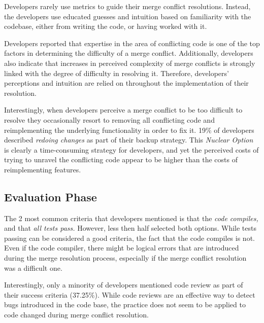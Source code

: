 Developers rarely use metrics to guide their merge conflict resolutions.
Instead, the developers use educated guesses and intuition based on familiarity with the codebase, either from writing the code, or having worked with it.

Developers reported that expertise in the area of conflicting code is one of the top factors in determining the difficulty of a merge conflict.
Additionally, developers also indicate that increases in perceived complexity of merge conflicts is strongly linked with the degree of difficulty in resolving it.
Therefore, developers' perceptions and intuition are relied on throughout the implementation of their resolution.

Interestingly, when developers perceive a merge conflict to be too difficult to resolve they occasionally resort to removing all conflicting code and reimplementing the underlying functionality in order to fix it.
19\% of developers described \textit{redoing changes} as part of their backup strategy.
This \textit{Nuclear Option} is clearly a time-consuming strategy for developers, and yet the perceived costs of trying to unravel the conflicting code appear to be higher than the costs of reimplementing features.

\subsection{Evaluation Phase}

The 2 most common criteria that developers mentioned is that the \emph{code compiles,} and that \emph{all tests pass.}
However, less then half selected both options.
While tests passing can be considered a good criteria, the fact that the code compiles is not.
Even if the code compiler, there might be logical errors that are introduced during the merge resolution process, especially if the merge conflict resolution was a difficult one.

Interestingly, only a minority of developers mentioned code review as part of their success criteria (37.25\%).
While code reviews are an effective way to detect bugs introduced in the code base, the practice does not seem to be applied to code changed during merge conflict resolution.

